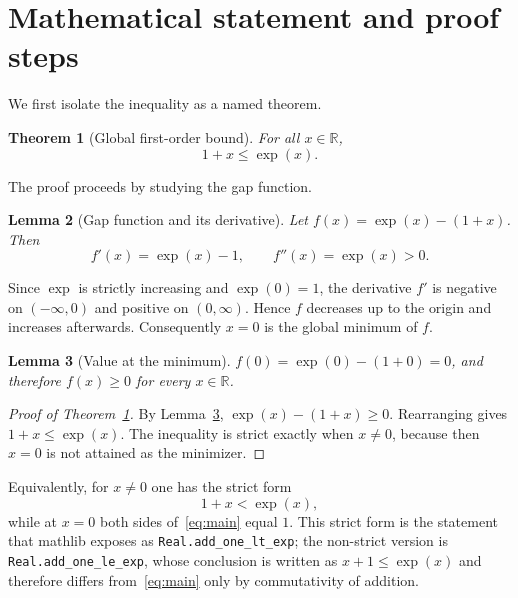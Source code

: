 \documentclass[11pt,a4paper]{article}
\theoremstyle{plain}
\newtheorem{theorem}{Theorem}
\newtheorem{lemma}[theorem]{Lemma}
\begin{document}
\section{Mathematical statement and proof steps}
\label{sec:math}

We first isolate the inequality as a named theorem.

\begin{theorem}[Global first-order bound]
  \label{thm:bound}
  For all $x\in\mathbb{R}$,
  \begin{equation}
    1 + x \leq \exp(x).
  \end{equation}
\end{theorem}

The proof proceeds by studying the gap function.

\begin{lemma}[Gap function and its derivative]
  \label{lem:gap}
  Let $f(x)=\exp(x)-(1+x)$.  Then
  \begin{equation}
    f'(x)=\exp(x)-1,
    \qquad
    f''(x)=\exp(x)>0.
  \end{equation}
\end{lemma}

Since $\exp$ is strictly increasing and $\exp(0)=1$, the derivative
$f'$ is negative on $(-\infty,0)$ and positive on $(0,\infty)$.  Hence
$f$ decreases up to the origin and increases afterwards.  Consequently
$x=0$ is the global minimum of $f$.

\begin{lemma}[Value at the minimum]
  \label{lem:min}
  $f(0)=\exp(0)-(1+0)=0$, and therefore $f(x)\geq 0$ for every
  $x\in\mathbb{R}$.
\end{lemma}

\begin{proof}[Proof of Theorem~\ref{thm:bound}]
  By Lemma~\ref{lem:min}, $\exp(x)-(1+x)\geq 0$.  Rearranging gives
  $1+x\leq\exp(x)$.  The inequality is strict exactly when $x\neq 0$,
  because then $x=0$ is not attained as the minimizer.
\end{proof}

Equivalently, for $x\neq 0$ one has the strict form
\begin{equation}
  \label{eq:strict}
  1+x < \exp(x),
\end{equation}
while at $x=0$ both sides of~\eqref{eq:main} equal $1$.  This strict form
is the statement that mathlib exposes as \texttt{Real.add\_one\_lt\_exp};
the non-strict version is \texttt{Real.add\_one\_le\_exp}, whose conclusion
is written as $x+1\leq\exp(x)$ and therefore differs from~\eqref{eq:main}
only by commutativity of addition.
\end{document}
